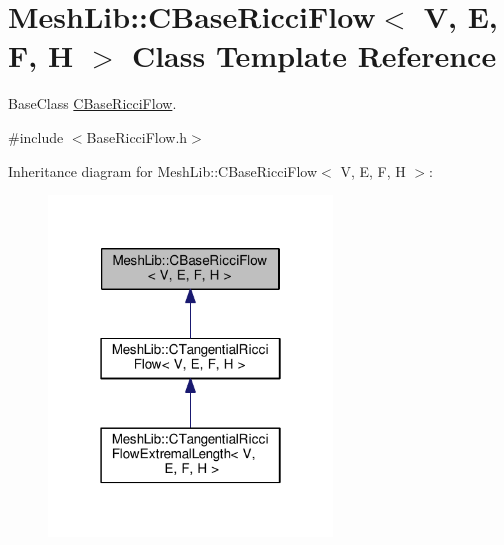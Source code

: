 \hypertarget{class_mesh_lib_1_1_c_base_ricci_flow}{}\section{Mesh\+Lib\+:\+:C\+Base\+Ricci\+Flow$<$ V, E, F, H $>$ Class Template Reference}
\label{class_mesh_lib_1_1_c_base_ricci_flow}


Base\+Class \hyperlink{class_mesh_lib_1_1_c_base_ricci_flow}{C\+Base\+Ricci\+Flow}.  




{\ttfamily \#include $<$Base\+Ricci\+Flow.\+h$>$}



Inheritance diagram for Mesh\+Lib\+:\+:C\+Base\+Ricci\+Flow$<$ V, E, F, H $>$\+:
\nopagebreak
\begin{figure}[H]
\begin{center}
\leavevmode
\includegraphics[width=214pt]{class_mesh_lib_1_1_c_base_ricci_flow__inherit__graph}
\end{center}
\end{figure}


